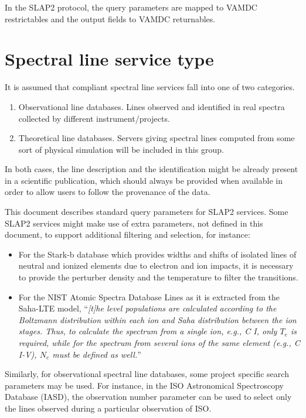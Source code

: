 \documentclass[11pt,a4paper]{ivoa}
\begin{document}
In the SLAP2 protocol, the query parameters are mapped to VAMDC restrictables and the output fields to VAMDC returnables.

\section{Spectral line service type}
\label{sect:service-type}

It is assumed that compliant spectral line services fall into one of two categories.

\begin{enumerate}
\item Observational line databases. Lines observed and identified in
real spectra collected by different instrument/projects.
\item Theoretical line databases. Servers giving
spectral lines computed from some sort of physical simulation
will be included in this group.
\end{enumerate}

In both cases, the line description and the identification might be
already present in a scientific publication, which should always be
provided when available in order to allow users to follow the
provenance of the data.

This document describes standard query parameters for SLAP2 services.
Some SLAP2 services might make use of extra parameters, not defined in this
document, to support additional filtering and selection, for instance:

\begin{itemize}
\item For the Stark-b database \citep{2012JPhCS.397a2019S} which provides widths and shifts of isolated lines of
neutral and ionized elements due to electron and ion impacts, it is necessary to provide the perturber density and
the temperature to filter the transitions.

\item For the NIST Atomic Spectra Database Lines \citep{NIST_ASD}
as it is extracted from the Saha-LTE model, ``\textit{[t]he level
populations are calculated according to the Boltzmann distribution
within each ion and Saha distribution between the ion stages. Thus, to
calculate the spectrum from a single ion, e.g., C I, only
$T_e$ is required, while for the
spectrum from several ions of the same element (e.g., C I-V),
$N_e$ must be defined as
well.}''
\end{itemize}

Similarly, for observational spectral line databases, some
project specific search parameters may be used.  For instance,
in the ISO Astronomical Spectroscopy Database (IASD),
the observation number parameter can be used to select only the lines
observed during a particular observation of ISO.
\end{document}
